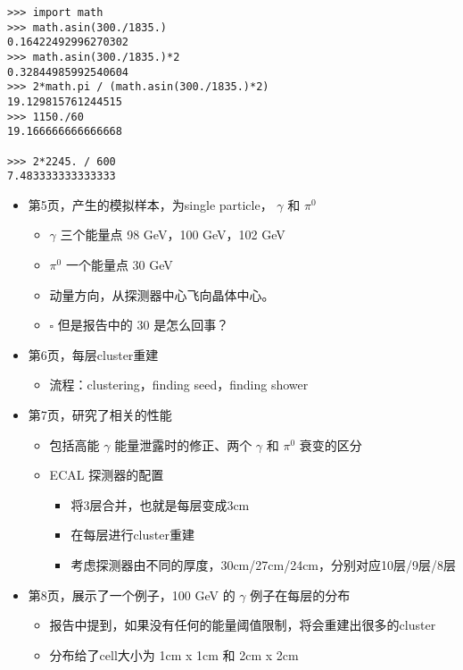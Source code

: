 \documentclass[11pt]{article}
\begin{document}
\begin{verbatim}
>>> import math
>>> math.asin(300./1835.)
0.16422492996270302
>>> math.asin(300./1835.)*2
0.32844985992540604
>>> 2*math.pi / (math.asin(300./1835.)*2)
19.129815761244515
>>> 1150./60
19.166666666666668

>>> 2*2245. / 600
7.483333333333333

\end{verbatim}

\begin{itemize}
\item 第5页，产生的模拟样本，为single particle， \(\gamma\) 和 \(\pi^0\)
\begin{itemize}
\item \(\gamma\) 三个能量点 98 GeV，100 GeV，102 GeV
\item \(\pi^0\) 一个能量点 30 GeV
\item 动量方向，从探测器中心飞向晶体中心。
\item{$\square$} 但是报告中的 30 是怎么回事？
\end{itemize}

\item 第6页，每层cluster重建
\begin{itemize}
\item 流程：clustering，finding seed，finding shower
\end{itemize}

\item 第7页，研究了相关的性能
\begin{itemize}
\item 包括高能 \(\gamma\) 能量泄露时的修正、两个 \(\gamma\) 和 \(\pi^0\) 衰变的区分
\item ECAL 探测器的配置
\begin{itemize}
\item 将3层合并，也就是每层变成3cm
\item 在每层进行cluster重建
\item 考虑探测器由不同的厚度，30cm/27cm/24cm，分别对应10层/9层/8层
\end{itemize}
\end{itemize}

\item 第8页，展示了一个例子，100 GeV 的 \(\gamma\) 例子在每层的分布
\begin{itemize}
\item 报告中提到，如果没有任何的能量阈值限制，将会重建出很多的cluster
\item 分布给了cell大小为 1cm x 1cm 和 2cm x 2cm
\end{itemize}


\end{itemize}
\end{document}
